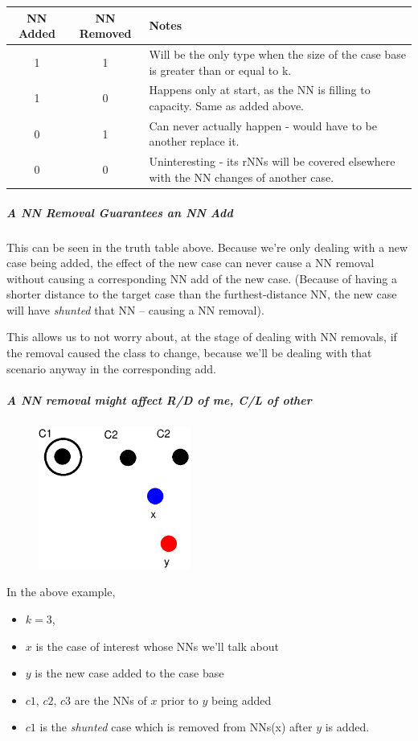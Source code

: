 \documentclass[a4paper,11pt]{report}
\begin{document}
\medskip

\begin{tabular}{ | c | c | p{5cm} |} \hline
	NN Added & NN Removed & Notes \\ \hline
	1 & 1 & Will be the only type when the size of the case base is greater than or equal to  k. \\ \hline
	1 & 0 & Happens only at start, as the NN is filling to capacity. Same as added above. \\ \hline
	0 & 1 & Can never actually happen - would have to be another replace it. \\ \hline
	0 & 0 & Uninteresting - its rNNs will be covered elsewhere with the NN changes of another case. \\ \hline
\end{tabular}

\subparagraph{A NN Removal Guarantees an NN Add}
This can be seen in the truth table above. Because we're only dealing with a new case being added, the effect of the new case can never cause a NN removal without causing a corresponding NN add of the new case. (Because of having a shorter distance to the target case than the furthest-distance NN, the new case will have \emph{shunted} that NN – causing a NN removal).

This allows us to not worry about, at the stage of dealing with NN removals, if the removal caused the class to change, because we'll be dealing with that scenario anyway in the corresponding add.

\subparagraph{A NN removal might affect R/D of me, C/L of other}

\begin{figure}[h!]
\includegraphics[width=5cm]{./Drawn/NnMightAffectEg}
\end{figure}


In the above example,
\begin{itemize}
	\item $k=3$, 
	\item $x$ is the case of interest whose NNs  we'll talk about
	\item $y$ is the new case added to the case base
	\item $c1$, $c2$, $c3$ are the NNs of $x$ prior to $y$ being added
	\item $c1$ is the \emph{shunted} case which is removed from NNs(x) after $y$ is added.
\end{itemize}
\end{document}
